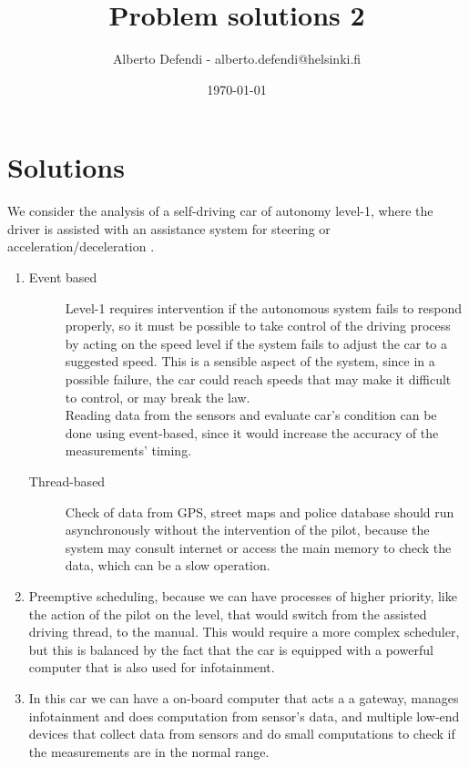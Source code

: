 \documentclass[a4paper, 12pt]{article}
\title{Problem solutions 2}
\author{Alberto Defendi - alberto.defendi@helsinki.fi}
\date{\today}
\begin{document}
\maketitle

\section{Solutions} %
\label{sec:solutions}
\begin{exercise}
We consider the analysis of a self-driving car of autonomy level-1, where the
driver is assisted with an assistance system for steering or
acceleration/deceleration \cite{car_levels_international_2014}.
\begin{enumerate}
    \item 
		\begin{description}
		    \item[Event based] Level-1 requires intervention if the 
				autonomous system fails to respond properly, so
				it must be possible to take control of the driving process by
				acting on the speed level if the system fails to adjust the car
				to a suggested speed. This is a sensible aspect of the system,
				since in a possible failure, the car could reach speeds that may 
				make it difficult to control, or may break the law.\\
				Reading data from the sensors and evaluate car's condition can
				be done using event-based, since it would increase the accuracy
				of the measurements' timing.
			\item[Thread-based] Check of data from GPS, street maps and police
				database should run
				asynchronously without the intervention of the pilot, because
				the system may consult internet or access the main memory to
				check the data, which can be a slow operation.
		\end{description}
	\item Preemptive scheduling, because we can have 
		processes of higher priority, 
		like the action of the pilot on the level, that would
		switch from the assisted driving thread, to the manual. This would
		require a more complex scheduler, but this is balanced by the fact that 
		the car is equipped with a powerful computer that is also used for
		infotainment.
	\item In this car we can have a on-board computer that acts a
		a gateway, manages infotainment and does computation from sensor's
		data, and multiple low-end devices that collect data from sensors and do
		small computations to check if the measurements are in the normal range.

\end{enumerate}
\end{exercise}
\end{document}
